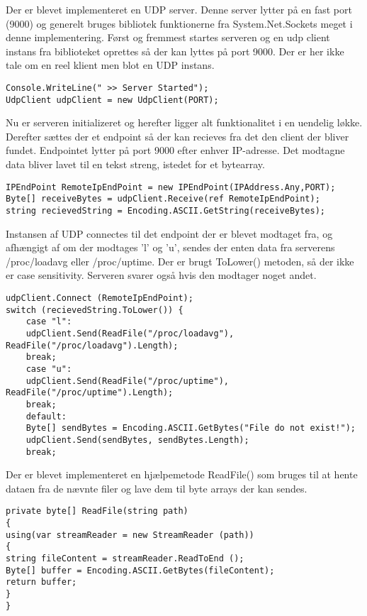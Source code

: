 Der er blevet implementeret en UDP server. Denne server lytter på en fast port (9000) og generelt bruges bibliotek funktionerne fra System.Net.Sockets meget i denne implementering. Først og fremmest startes serveren og en udp client instans fra biblioteket oprettes så der kan lyttes på port 9000. Der er her ikke tale om en reel klient men blot en UDP instans.

\begin{verbatim}
Console.WriteLine(" >> Server Started");
UdpClient udpClient = new UdpClient(PORT);
\end{verbatim}

\noindent Nu er serveren initializeret og herefter ligger alt funktionalitet i en uendelig løkke. Derefter sættes der et endpoint så der kan recieves fra det den client der bliver fundet. Endpointet lytter på port 9000 efter enhver IP-adresse. Det modtagne data bliver lavet til en tekst streng, istedet for et bytearray.  

\begin{verbatim}
IPEndPoint RemoteIpEndPoint = new IPEndPoint(IPAddress.Any,PORT);
Byte[] receiveBytes = udpClient.Receive(ref RemoteIpEndPoint);
string recievedString = Encoding.ASCII.GetString(receiveBytes);
\end{verbatim}

\noindent Instansen af UDP connectes til det endpoint der er blevet modtaget fra, og afhængigt af om der modtages 'l' og 'u', sendes der enten data fra serverens /proc/loadavg eller /proc/uptime. Der er brugt ToLower() metoden, så der ikke er case sensitivity. Serveren svarer også hvis den modtager noget andet.

\begin{verbatim}
udpClient.Connect (RemoteIpEndPoint);
switch (recievedString.ToLower()) {
	case "l":
	udpClient.Send(ReadFile("/proc/loadavg"), ReadFile("/proc/loadavg").Length);
	break;
	case "u":
	udpClient.Send(ReadFile("/proc/uptime"), ReadFile("/proc/uptime").Length);
	break;
	default:
	Byte[] sendBytes = Encoding.ASCII.GetBytes("File do not exist!");
	udpClient.Send(sendBytes, sendBytes.Length);
	break;
\end{verbatim}

\noindent Der er blevet implementeret en hjælpemetode ReadFile() som bruges til at hente dataen fra de nævnte filer og lave dem til byte arrays der kan sendes.

\begin{verbatim}
private byte[] ReadFile(string path)
{
using(var streamReader = new StreamReader (path))
{
string fileContent = streamReader.ReadToEnd ();
Byte[] buffer = Encoding.ASCII.GetBytes(fileContent);
return buffer;
}
}
\end{verbatim}

